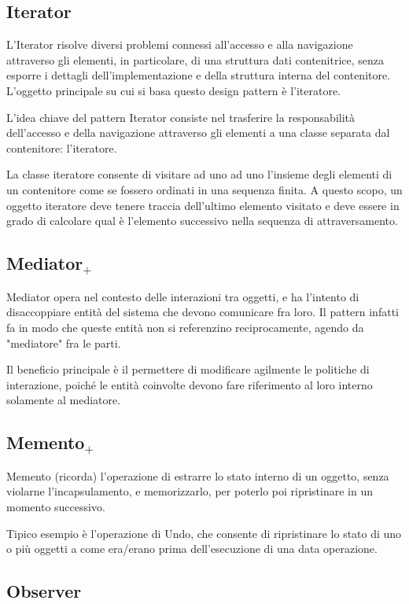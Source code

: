 \subsection{Iterator}
L'Iterator risolve diversi problemi connessi all'accesso e alla navigazione attraverso gli elementi, in particolare, di una struttura dati contenitrice, senza esporre i dettagli dell'implementazione e della struttura interna del contenitore. L'oggetto principale su cui si basa questo design pattern è l'iteratore.

L'idea chiave del pattern Iterator consiste nel trasferire la responsabilità dell'accesso e della navigazione attraverso gli elementi a una classe separata dal contenitore: l'iteratore.

La classe iteratore consente di visitare ad uno ad uno l'insieme degli elementi di un contenitore come se fossero ordinati in una sequenza finita. A questo scopo, un oggetto iteratore deve tenere traccia dell'ultimo elemento visitato e deve essere in grado di calcolare qual è l'elemento successivo nella sequenza di attraversamento.

\subsection{Mediator$_+$}
Mediator opera nel contesto delle interazioni tra oggetti, e ha l'intento di disaccoppiare entità del sistema che devono comunicare fra loro. Il pattern infatti fa in modo che queste entità non si referenzino reciprocamente, agendo da "mediatore" fra le parti.

Il beneficio principale è il permettere di modificare agilmente le politiche di interazione, poiché le entità coinvolte devono fare riferimento al loro interno solamente al mediatore.

\subsection{Memento$_+$}
Memento (ricorda) l'operazione di estrarre lo stato interno di un oggetto, senza violarne l'incapsulamento, e memorizzarlo, per poterlo poi ripristinare in un momento successivo.

Tipico esempio è l'operazione di Undo, che consente di ripristinare lo stato di uno o più oggetti a come era/erano prima dell'esecuzione di una data operazione.
\subsection{Observer}

